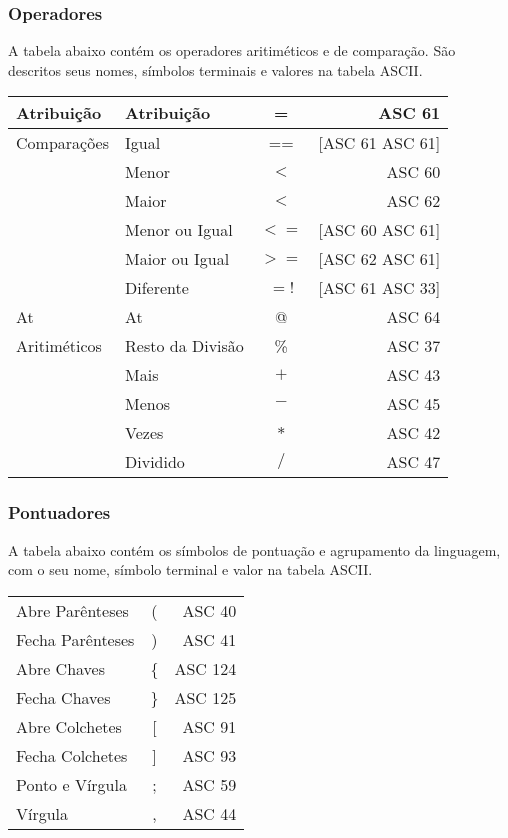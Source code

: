 \documentclass[a4paper,10pt]{article}
\begin{document}
		\subsubsection{Operadores}
		A tabela abaixo cont\'em os operadores aritim\'eticos e de compara\c{c}\~ao. S\~ao descritos seus nomes, s\'imbolos terminais e valores na tabela ASCII.
		\begin{center}
		\begin{tabular}{| l | l | c | r |}
		  \hline
			Atribui\c{c}\~ao & Atribui\c{c}\~{a}o & = & ASC 61 \\
			\hline
			Compara\c{c}\~oes & Igual & == & [ASC 61 ASC 61]\\
			& Menor & $<$ & ASC 60 \\
			& Maior & $<$ & ASC 62 \\
			& Menor ou Igual & $<=$ & [ASC 60 ASC 61] \\
			& Maior ou Igual & $>=$ & [ASC 62 ASC 61] \\
			& Diferente & $=!$ & [ASC 61 ASC 33] \\
			\hline
			At & At & @ & ASC 64 \\
			\hline
			Aritim\'eticos& Resto da Divis\~ao & \% & ASC 37 \\
			& Mais & $+$ & ASC 43 \\
			& Menos & $-$ & ASC 45 \\
			& Vezes & $*$ & ASC 42 \\
			& Dividido & $/$ & ASC 47 \\
		  \hline
		\end{tabular}
		\end{center}
		
		\subsubsection{Pontuadores}
		A tabela abaixo cont\'em os s\'imbolos de pontua\c{c}\~ao e agrupamento da linguagem, com o seu nome, s\'imbolo terminal e valor na tabela ASCII.
		\begin{center}
		 \begin{tabular}{| l | c | r |}
		  \hline
			Abre Par\^enteses & ( & ASC 40\\
			Fecha Par\^enteses & ) & ASC 41\\
			Abre Chaves & \{ & ASC 124\\
			Fecha Chaves & \} & ASC 125\\
			Abre Colchetes & [ & ASC 91\\
			Fecha Colchetes & ] & ASC 93\\
			Ponto e V\'irgula & ; & ASC 59\\
			V\'irgula & , & ASC 44 \\
		  \hline
		 \end{tabular}
		\end{center}
\end{document}
